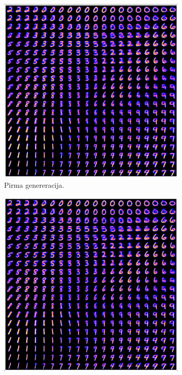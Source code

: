 \documentclass{VUMIFInfKursinis}
\begin{document}
\begin{figure}[H]
    \centering
    \begin{subfigure}[t]{0.4\textwidth} %
        \centering
        \includegraphics[scale=0.28]{img/fresh_generation_1.png}
        \caption{Pirma genereracija.}
        \label{img:image1}
    \end{subfigure}
    \hfill %
    \begin{subfigure}[t]{0.45\textwidth} %
        \centering
        \includegraphics[scale=0.28]{img/fresh_generation_5.png}

\end{subfigure}
\end{figure}
\end{document}
